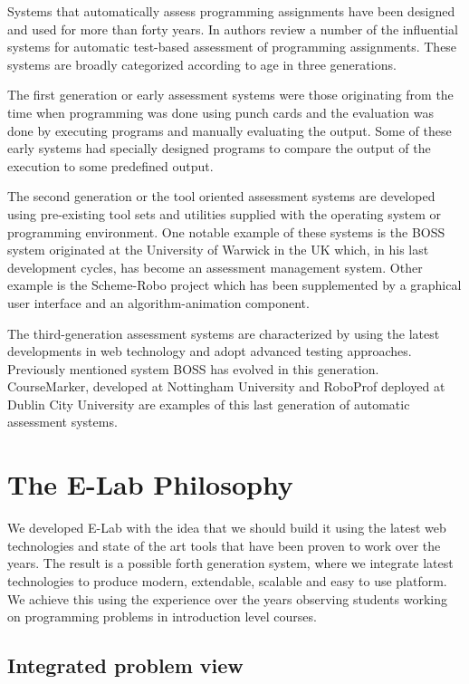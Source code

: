 \documentclass{llncs}
\begin{document}
Systems that automatically assess programming assignments have been designed and
used for more than forty years. In \cite{douce2005automatic} authors review a
number of the influential systems for automatic test-based assessment of programming
assignments. These systems are broadly categorized according to age in three
generations.

The first generation or early assessment systems were those originating from the
time when programming was done using punch cards and the evaluation was done by
executing programs and manually evaluating the output. Some of these early
systems had specially designed programs to compare the output of the execution
to some predefined output.

The second generation or the tool oriented assessment systems are developed
using pre-existing tool sets and utilities supplied with the operating system or
programming environment. One notable example of these systems is the BOSS system
originated at the University of Warwick in the UK \cite{joy2005boss} which, in his last
development cycles, has become an assessment management system. Other example is
the Scheme-Robo project \cite{saikkonen2001fully} which has been supplemented by a graphical user
interface and an algorithm-animation component.

The third-generation assessment systems are characterized by using the latest
developments in web technology and adopt advanced testing approaches. Previously
mentioned system BOSS has evolved in this generation. CourseMarker, developed at
Nottingham University \cite{higgins2003coursemarker} and RoboProf deployed at
Dublin City University \cite{daly2004automated} are examples of this last
generation of automatic assessment systems.


\section{The E-Lab Philosophy}

We developed E-Lab with the idea that we should build it using the latest web
technologies and state of the art tools that have been proven to work over the
years. The result is a possible forth generation system, where we integrate
latest technologies to produce modern, extendable, scalable and easy to use
platform. We achieve this using the experience over the years observing students
working on programming problems in introduction level courses.

\subsection{Integrated problem view}
\end{document}
